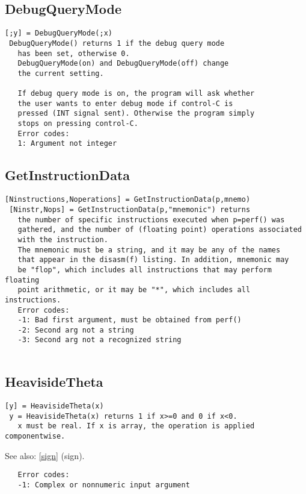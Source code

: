 \documentclass[a4paper]{article}
\begin{document}
\subsection{DebugQueryMode\label{DebugQueryMode}}

\begin{tscreen}
\begin{verbatim}
[;y] = DebugQueryMode(;x)
 DebugQueryMode() returns 1 if the debug query mode
   has been set, otherwise 0.
   DebugQueryMode(on) and DebugQueryMode(off) change
   the current setting.

   If debug query mode is on, the program will ask whether
   the user wants to enter debug mode if control-C is
   pressed (INT signal sent). Otherwise the program simply
   stops on pressing control-C.
   Error codes:
   1: Argument not integer 
\end{verbatim}
\end{tscreen}



\subsection{GetInstructionData\label{GetInstructionData}}

\begin{tscreen}
\begin{verbatim}
[Ninstructions,Noperations] = GetInstructionData(p,mnemo)
 [Ninstr,Nops] = GetInstructionData(p,"mnemonic") returns
   the number of specific instructions executed when p=perf() was
   gathered, and the number of (floating point) operations associated
   with the instruction.
   The mnemonic must be a string, and it may be any of the names
   that appear in the disasm(f) listing. In addition, mnemonic may
   be "flop", which includes all instructions that may perform floating
   point arithmetic, or it may be "*", which includes all instructions.
   Error codes:
   -1: Bad first argument, must be obtained from perf()
   -2: Second arg not a string
   -3: Second arg not a recognized string
   
\end{verbatim}
\end{tscreen}



\subsection{HeavisideTheta\label{HeavisideTheta}}

\begin{tscreen}
\begin{verbatim}
[y] = HeavisideTheta(x)
 y = HeavisideTheta(x) returns 1 if x>=0 and 0 if x<0.
   x must be real. If x is array, the operation is applied componentwise.
\end{verbatim}

See also: \ref{sign} {(sign)}.
\begin{verbatim}
   Error codes:
   -1: Complex or nonnumeric input argument 
\end{verbatim}
\end{tscreen}
\end{document}
